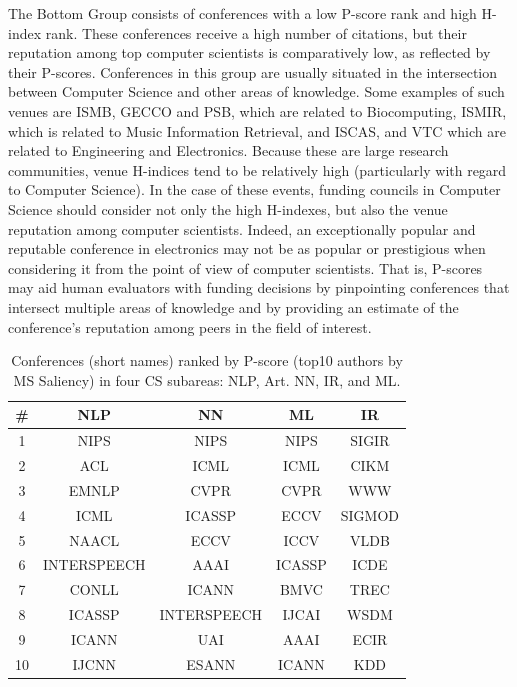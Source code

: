 \documentclass[notitlepage]{svjour3}
\begin{document}
The Bottom Group consists of conferences with a low P-score rank and high H-index rank. These conferences
receive a high number of citations, but their reputation among top computer scientists is comparatively low, as reflected by their P-scores. Conferences in this
group are usually situated in the intersection between Computer Science and other areas of knowledge. Some examples of such venues are
ISMB, GECCO and PSB, which are related to Biocomputing, ISMIR, which is related to Music Information Retrieval, and
ISCAS, and VTC which are related to Engineering and Electronics. Because these are large research communities, venue H-indices tend to be 
relatively high (particularly with regard to Computer Science). In the case of these events, funding councils in Computer Science should consider not only the high H-indexes, but also the venue reputation among computer
scientists. Indeed, an exceptionally popular and reputable conference in electronics may not be as 
popular or prestigious when considering it from the point of view of computer scientists. That is, P-scores may aid 
human evaluators with funding decisions by pinpointing conferences that intersect multiple areas of knowledge and by providing
an estimate of the conference's reputation among peers in the field of interest.

\begin{table}[ht!]
  \small
  \centering
  \begin{tabular}{c c c c c} 
  \toprule
  \# & NLP & NN & ML & IR  \\ 
  \midrule
  1  & NIPS & NIPS & NIPS & SIGIR \\
  2  & ACL & ICML & ICML & CIKM \\
  3  & EMNLP & CVPR & CVPR & WWW \\
  4  & ICML & ICASSP & ECCV & SIGMOD \\
  5  & NAACL & ECCV & ICCV & VLDB \\
  6  & INTERSPEECH & AAAI & ICASSP & ICDE \\
  7  & CONLL & ICANN & BMVC & TREC \\
  8  & ICASSP & INTERSPEECH & IJCAI & WSDM \\
  9  & ICANN & UAI & AAAI & ECIR \\
  10 & IJCNN & ESANN & ICANN & KDD \\
  \bottomrule
  \end{tabular}
  \caption{Conferences (short names) ranked by P-score (top10 authors by MS Saliency) in four CS subareas: NLP, Art. NN, IR, and ML.}
  \label{tab:subareas-saliency}
\end{table}
\end{document}
